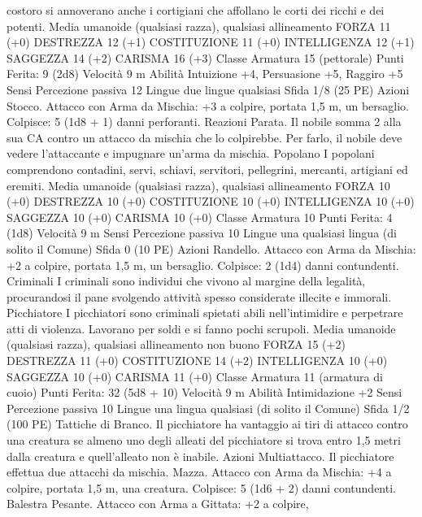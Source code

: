 \begin{multicols}{2}
costoro si annoverano anche i cortigiani che affollano le
corti dei ricchi e dei potenti.
Media umanoide (qualsiasi razza), qualsiasi allineamento
FORZA 11 (+0)
DESTREZZA 12 (+1)
COSTITUZIONE 11 (+0)
INTELLIGENZA 12 (+1)
SAGGEZZA 14 (+2)
CARISMA 16 (+3)
Classe Armatura 15 (pettorale)
\hspace*{0pt}\hfill{Punti Ferita}: 9 (2d8)
Velocità 9 m
Abilità Intuizione +4, Persuasione +5, Raggiro +5
Sensi Percezione passiva 12
Lingue due lingue qualsiasi
Sfida 1/8 (25 PE)
Azioni
Stocco. Attacco con Arma da Mischia: +3 a colpire, portata 1,5
m, un bersaglio.
Colpisce: 5 (1d8 + 1) danni perforanti.
Reazioni
Parata. Il nobile somma 2 alla sua CA contro un attacco da
mischia che lo colpirebbe. Per farlo, il nobile deve vedere
l’attaccante e impugnare un’arma da mischia.
Popolano
I popolani comprendono contadini, servi, schiavi,
servitori, pellegrini, mercanti, artigiani ed eremiti.
Media umanoide (qualsiasi razza), qualsiasi allineamento
FORZA 10 (+0)
DESTREZZA 10 (+0)
COSTITUZIONE 10 (+0)
INTELLIGENZA 10 (+0)
SAGGEZZA 10 (+0)
CARISMA 10 (+0)
Classe Armatura 10
\hspace*{0pt}\hfill{Punti Ferita}: 4 (1d8)
Velocità 9 m
Sensi Percezione passiva 10
Lingue una qualsiasi lingua (di solito il Comune)
Sfida 0 (10 PE)
Azioni
Randello. Attacco con Arma da Mischia: +2 a colpire, portata
1,5 m, un bersaglio.
Colpisce: 2 (1d4) danni contundenti.
Criminali
I criminali sono individui che vivono al margine della
legalità, procurandosi il pane svolgendo attività spesso
considerate illecite e immorali.
Picchiatore
I picchiatori sono criminali spietati abili nell’intimidire e
perpetrare atti di violenza. Lavorano per soldi e si fanno
pochi scrupoli.
Media umanoide (qualsiasi razza), qualsiasi allineamento non
buono
FORZA 15 (+2)
DESTREZZA 11 (+0)
COSTITUZIONE 14 (+2)
INTELLIGENZA 10 (+0)
SAGGEZZA 10 (+0)
CARISMA 11 (+0)
Classe Armatura 11 (armatura di cuoio)
\hspace*{0pt}\hfill{Punti Ferita}: 32 (5d8 + 10)
Velocità 9 m
Abilità Intimidazione +2
Sensi Percezione passiva 10
Lingue una lingua qualsiasi (di solito il Comune)
Sfida 1/2 (100 PE)
Tattiche di Branco. Il picchiatore ha vantaggio ai tiri di attacco
contro una creatura se almeno uno degli alleati del picchiatore si
trova entro 1,5 metri dalla creatura e quell’alleato non è inabile.
Azioni
Multiattacco. Il picchiatore effettua due attacchi da mischia.
Mazza. Attacco con Arma da Mischia: +4 a colpire, portata 1,5
m, una creatura.
Colpisce: 5 (1d6 + 2) danni contundenti.
Balestra Pesante. Attacco con Arma a Gittata: +2 a colpire,

\end{multicols}

